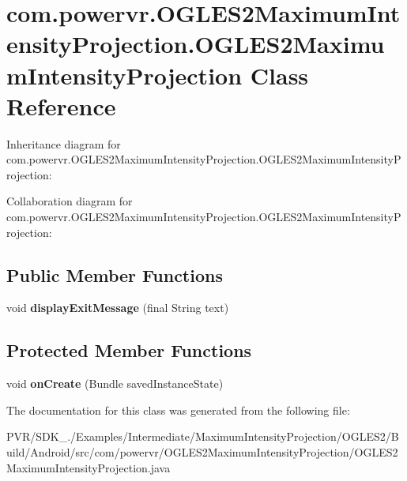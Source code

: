 \hypertarget{classcom_1_1powervr_1_1_o_g_l_e_s2_maximum_intensity_projection_1_1_o_g_l_e_s2_maximum_intensity_projection}{\section{com.\+powervr.\+O\+G\+L\+E\+S2\+Maximum\+Intensity\+Projection.\+O\+G\+L\+E\+S2\+Maximum\+Intensity\+Projection Class Reference}
\label{classcom_1_1powervr_1_1_o_g_l_e_s2_maximum_intensity_projection_1_1_o_g_l_e_s2_maximum_intensity_projection}
}


Inheritance diagram for com.\+powervr.\+O\+G\+L\+E\+S2\+Maximum\+Intensity\+Projection.\+O\+G\+L\+E\+S2\+Maximum\+Intensity\+Projection\+:


Collaboration diagram for com.\+powervr.\+O\+G\+L\+E\+S2\+Maximum\+Intensity\+Projection.\+O\+G\+L\+E\+S2\+Maximum\+Intensity\+Projection\+:
\subsection*{Public Member Functions}
\begin{DoxyCompactItemize}
\item 
\hypertarget{classcom_1_1powervr_1_1_o_g_l_e_s2_maximum_intensity_projection_1_1_o_g_l_e_s2_maximum_intensity_projection_a1f71b2e2d80fa534ea1358c040687307}{void {\bfseries display\+Exit\+Message} (final String text)}\label{classcom_1_1powervr_1_1_o_g_l_e_s2_maximum_intensity_projection_1_1_o_g_l_e_s2_maximum_intensity_projection_a1f71b2e2d80fa534ea1358c040687307}

\end{DoxyCompactItemize}
\subsection*{Protected Member Functions}
\begin{DoxyCompactItemize}
\item 
\hypertarget{classcom_1_1powervr_1_1_o_g_l_e_s2_maximum_intensity_projection_1_1_o_g_l_e_s2_maximum_intensity_projection_a9fe99049156a3cbec1dfa7092da25f21}{void {\bfseries on\+Create} (Bundle saved\+Instance\+State)}\label{classcom_1_1powervr_1_1_o_g_l_e_s2_maximum_intensity_projection_1_1_o_g_l_e_s2_maximum_intensity_projection_a9fe99049156a3cbec1dfa7092da25f21}

\end{DoxyCompactItemize}


The documentation for this class was generated from the following file\+:\begin{DoxyCompactItemize}
\item 
P\+V\+R/\+S\+D\+K\+\_./\+Examples/\+Intermediate/\+Maximum\+Intensity\+Projection/\+O\+G\+L\+E\+S2/\+Build/\+Android/src/com/powervr/\+O\+G\+L\+E\+S2\+Maximum\+Intensity\+Projection/O\+G\+L\+E\+S2\+Maximum\+Intensity\+Projection.\+java\end{DoxyCompactItemize}
